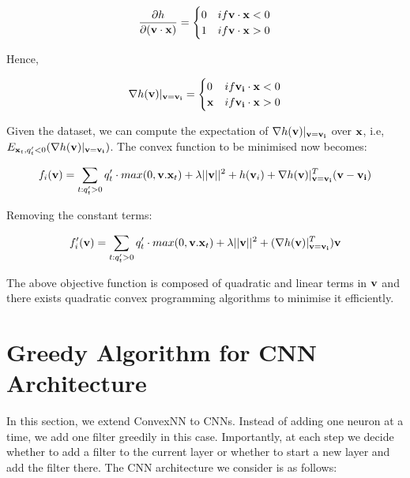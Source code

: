 \documentclass{article}
\begin{document}
\begin{align}
\frac{\partial h}{\partial {\bf (v\cdot x)}} = 
\begin{cases}
0 & if {\bf v\cdot x} < 0 \\
1 & if {\bf v\cdot x} > 0 \\
\end{cases} 
\end{align}

Hence, 

\begin{align}
\nabla h({\bf v})|_{\bf v = v_i} =
\begin{cases}
0 & if {\bf v_i \cdot x} < 0 \\
{\bf x} & if {\bf v_i \cdot x} > 0 \\
\end{cases} 
\end{align}

Given the dataset, we can compute the expectation of $\nabla h({\bf v})|_{\bf v = v_i}$ over ${\bf x}$, i.e, $E_{{\bf x}_t, q'_t < 0}(\nabla h({\bf v})|_{\bf v = v_i})$. The convex function to be minimised now becomes:

\begin{align}
f_i({\bf v}) = \sum_{t: q'_t > 0} q'_t \cdot max(0, {\bf v}.{\bf x}_t) + \lambda ||{\bf v}||^2 + h({\bf v}_i) + \nabla h({\bf v})|_{\bf v = v_i}^T ({\bf v} - {\bf v_i})
\end{align}

Removing the constant terms:

\begin{align}
f'_i({\bf v}) = \sum_{t: q'_t > 0} q'_t \cdot max(0, {\bf v}.{\bf x}_t) + \lambda ||{\bf v}||^2 + (\nabla h({\bf v})|_{\bf v = v_i}^T) {\bf v}
\end{align}

The above objective function is composed of quadratic and linear terms in ${\bf v}$ and there exists quadratic convex programming algorithms to minimise it efficiently.

\section{Greedy Algorithm for CNN Architecture}

In this section, we extend ConvexNN to CNNs. Instead of adding one neuron at a time, we add one filter greedily in this case. Importantly, at each step we decide whether to add a filter to the current layer or whether to start a new layer and add the filter there. The CNN architecture we consider is as follows:
\end{document}
